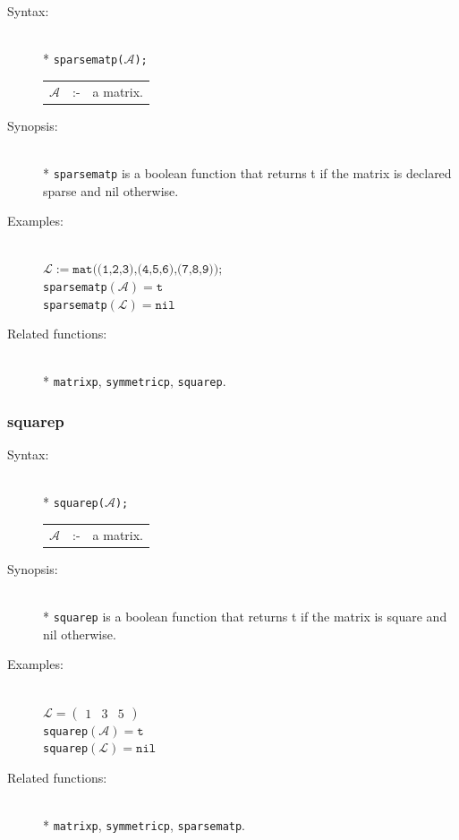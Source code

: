\begin{description}
\item[Syntax:]\mbox{}\\*
{\tt sparsematp($\mathcal{A}$);}\\[2mm]
\begin{tabular}{l l l}
$\mathcal{A}$ &:-& a matrix.
\end{tabular}

\item[Synopsis:]\mbox{}\\*
\texttt{sparsematp} is a boolean function that returns t if
                the matrix is declared sparse and nil otherwise.

\item[Examples:]\mbox{}\\
\(\mathcal{L} := \texttt{mat((1,2,3),(4,5,6),(7,8,9));}\) \\[2mm]
\texttt{sparsematp}\((\mathcal{A}) = \texttt{t}\) \\[2mm]
\texttt{sparsematp}\((\mathcal{L}) = \texttt{nil}\)

\item[Related functions:]\mbox{}\\*
\texttt{matrixp}, \texttt{symmetricp}, \texttt{squarep}.
\end{description}

\subsubsection{squarep}
\label{sparse:squarep}

\begin{description}
\item[Syntax:]\mbox{}\\*
{\tt squarep($\mathcal{A}$);}\\[2mm]
\begin{tabular}{l l l}
$\mathcal{A}$ &:-& a matrix.
\end{tabular}

\item[Synopsis:]\mbox{}\\*
\texttt{squarep} is a boolean function that returns t if
                the matrix is square and nil otherwise.

\item[Examples:]\mbox{}\\
\(\mathcal{L} = \begin{pmatrix} 1 & 3 & 5 \end{pmatrix}\) \\[2mm]
\texttt{squarep}\((\mathcal{A}) = \texttt{t}\) \\[2mm]
\texttt{squarep}\((\mathcal{L}) = \texttt{nil}\)

\item[Related functions:]\mbox{}\\*
\texttt{matrixp}, \texttt{symmetricp}, \texttt{sparsematp}.
\end{description}


